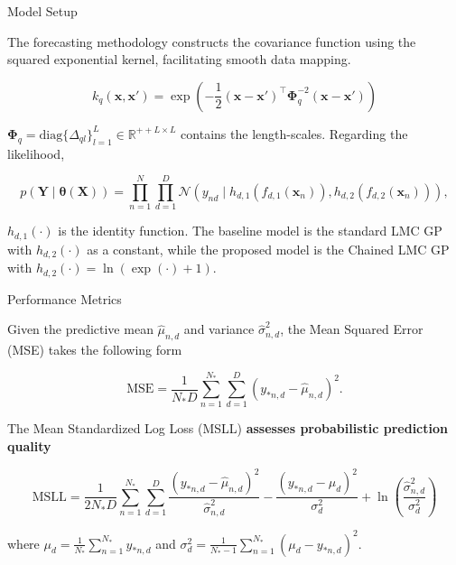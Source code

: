 \begin{frame}{Model Setup}

\begin{block}{}
	The forecasting methodology constructs the covariance function using the squared exponential kernel, facilitating smooth data mapping.
\end{block}


\[
	k_{q}\left(\boldsymbol{x}, \boldsymbol{x}' \right) = \exp\left(-\frac{1}{2}(\boldsymbol{x} - \boldsymbol{x}')^\top \boldsymbol{\Phi}_q^{-2} (\boldsymbol{x} - \boldsymbol{x}')\right)
\]

\begin{block}{}
\( \boldsymbol{\Phi}_q=\text{diag}\{\Delta_{ql}\}_{l=1}^{L} \in \mathbb{R}^{++L \times L} \) contains the length-scales. Regarding the likelihood,
\end{block}

\[
	p(\boldsymbol{Y} \mid \boldsymbol{\theta}(\boldsymbol{X})) = \prod_{n=1}^{N}\prod_{d=1}^{D} \mathcal{N}\left(y_{nd} \mid h_{d,1}(f_{d,1}(\mathbf{x}_n)), h_{d,2}(f_{d,2}(\mathbf{x}_n)) \right),
\]

\begin{block}{}
$h_{d,1}(\cdot)$ is the identity function. The baseline model is the standard LMC GP with $h_{d,2}(\cdot)$ as a constant, while the proposed model is the Chained LMC GP with $h_{d,2}(\cdot) = \ln(\exp(\cdot)+1)$.
\end{block}

\end{frame}


\begin{frame}{Performance Metrics}

\begin{block}{}
	Given the predictive mean \( \hat{\mu}_{n,d}\) and variance \( \hat{\sigma}^2_{n,d}\), the Mean Squared Error (MSE) takes the following form
\end{block}

\[
	\text{MSE} = \frac{1}{N_{*}D} \sum_{n=1}^{N_*} \sum_{d=1}^{D} \left( y_{*n,d} - \hat{\mu}_{n,d} \right)^2.
\]

\begin{block}{}
The Mean Standardized Log Loss (MSLL) \textcolor{BrandTeal}{\textbf{assesses probabilistic prediction quality}}~\cite{RasmussenW06}
\end{block}

\[
	\text{MSLL} = \frac{1}{2N_{*}D} \sum_{n=1}^{N_*} \sum_{d=1}^{D}  \frac{(y_{*n,d} - \hat{\mu}_{n,d} )^2}{\hat{\sigma}^2_{n,d}}
	- \frac{(y_{*n,d} - \mu_d)^2}{\sigma_d^2} + \ln \left(\frac{\hat{\sigma}^2_{n,d}}{\sigma_d^2}\right)
\]

\begin{block}{}
	where \( \mu_d = \frac{1}{N_*} \sum_{n=1}^{N_*} y_{*n,d}\) and \( \sigma_d^2 = \frac{1}{N_* - 1} \sum_{n=1}^{N_*} (\mu_d - y_{*n,d})^2 \).
\end{block}

\end{frame}

